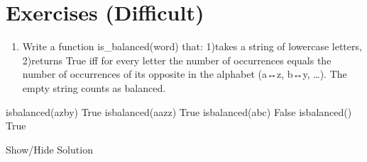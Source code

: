 \documentclass[letterpaper,10pt,english]{sphinxmanual}
\begin{document}
\section{Exercises (Difficult)}
\label{\detokenize{M1_practical1:Exercises-(Difficult)}}\begin{enumerate}
%
\item {} 
\sphinxAtStartPar
{} Write a function is\_balanced(word) that: 1)takes a string of lowercase letters, 2)returns True iff for every letter the number of occurrences equals the number of occurrences of its opposite in the alphabet (a↔z, b↔y, …). The empty string counts as balanced.

\end{enumerate}

\begin{sphinxVerbatim}[commandchars=\\\{\}]
is\PYGZus{}balanced(\PYGZdq{}azby\PYGZdq{})   \PYGZsh{} True
is\PYGZus{}balanced(\PYGZdq{}aazz\PYGZdq{})   \PYGZsh{} True
is\PYGZus{}balanced(\PYGZdq{}abc\PYGZdq{})    \PYGZsh{} False
is\PYGZus{}balanced(\PYGZdq{}\PYGZdq{})       \PYGZsh{} True
\end{sphinxVerbatim}



\sphinxAtStartPar
Show/Hide Solution
\end{document}
